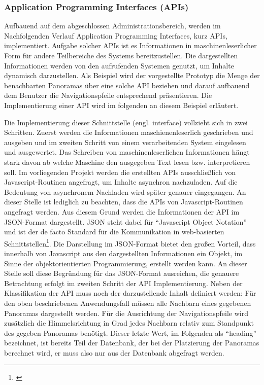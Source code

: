 \subsubsection{Application Programming Interfaces (APIs)}
\label{sec:APIs}

Aufbauend auf dem abgeschlossen Administrationsbereich, werden im Nachfolgenden Verlauf Application Programming Interfaces, kurz APIs, implementiert. Aufgabe solcher APIs ist es Informationen in maschinenleserlicher Form für andere Teilbereiche des Systems bereitzustellen. Die dargestellten Informationen werden von den aufrufenden Systemen genutzt, um Inhalte dynamisch darzustellen. Als Beispiel wird der vorgestellte Prototyp die Menge der benachbarten Panoramas über eine solche API beziehen und darauf aufbauend dem Benutzer die Navigationspfeile entsprechend präsentieren. Die Implementierung einer API wird im folgenden an diesem Beispiel erläutert.

Die Implementierung dieser Schnittstelle (engl. interface) vollzieht sich in zwei Schritten. Zuerst werden die Informationen maschienenleserlich geschrieben und ausgeben und im zweiten Schritt von einem verarbeitenden System eingelesen und ausgewertet. Das Schreiben von maschinenleserlichen Informationen hängt stark davon ab welche Maschine den ausgegeben Text lesen bzw. interpretieren soll. Im vorliegenden Projekt werden die erstellten APIs ausschließlich von Javascript-Routinen angefragt, um Inhalte asynchron nachzuladen. Auf die Bedeutung von asynchronem Nachladen wird später
genauer eingegangen.
An dieser Stelle ist lediglich zu beachten, dass die APIs von Javascript-Routinen angefragt werden. Aus diesem Grund werden die Informationen der API im JSON-Format dargestellt. JSON steht dabei für "`Javascript Object Notation"' und ist der de facto Standard für die Kommunikation in web-basierten Schnittstellen\footnote{\citet[S.~20]{lubbers2011}}. Die Darstellung im JSON-Format bietet den großen Vorteil, dass innerhalb von Javascript aus den dargestellten Informationen ein Objekt, im Sinne der objektorientierten Programmierung\footnotemark, erstellt werden kann. An dieser Stelle soll diese Begründung für das JSON-Format ausreichen, die genauere Betrachtung erfolgt im zweiten Schritt der API Implementierung. Neben der Klassifikation der API muss noch der darzustellende Inhalt definiert werden: Für den oben beschriebenen Anwendungsfall müssen alle Nachbarn eines gegebenen Panoramas dargestellt werden. Für die Ausrichtung der Navigationspfeile wird zusätzlich die Himmelsrichtung in Grad jedes Nachbarn relativ zum Standpunkt des gegeben Panoramas benötigt. Dieser letzte Wert, im Folgenden als "`heading"' bezeichnet, ist bereits Teil der Datenbank, der bei der Platzierung der Panoramas berechnet wird, er muss also nur aus der Datenbank abgefragt werden.

